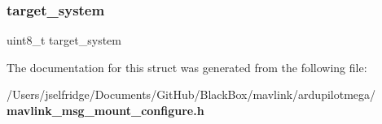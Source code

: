 \subsubsection{target\+\_\+system}
{\footnotesize\ttfamily uint8\+\_\+t target\+\_\+system}



The documentation for this struct was generated from the following file\+:\begin{DoxyCompactItemize}
\item 
/\+Users/jselfridge/\+Documents/\+Git\+Hub/\+Black\+Box/mavlink/ardupilotmega/\textbf{ mavlink\+\_\+msg\+\_\+mount\+\_\+configure.\+h}\end{DoxyCompactItemize}
